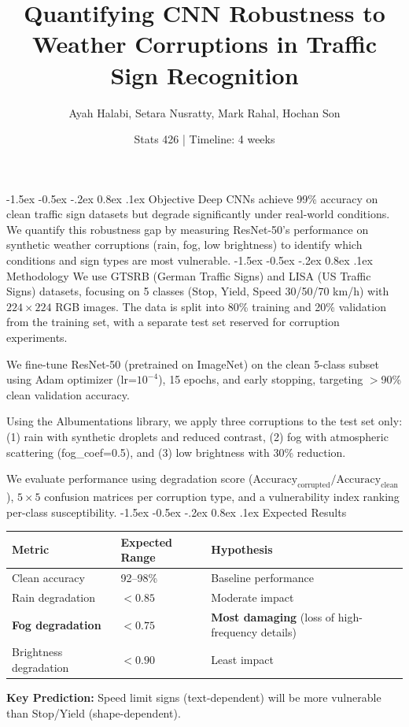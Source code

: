 \documentclass[10pt]{article}
\title{Quantifying CNN Robustness to Weather Corruptions in Traffic Sign Recognition}
\author{Ayah Halabi, Setara Nusratty, Mark Rahal, Hochan Son}
\date{Stats 426 | Timeline: 4 weeks}
\makeatletter
\renewcommand\section{\@startsection{section}{1}{\z@}%
  {-1.5ex \@plus -0.5ex \@minus -.2ex}%
  {0.8ex \@plus.1ex}%
  {\normalfont\Large\bfseries}}
\makeatother
\begin{document}
\maketitle
\section{Objective}
Deep CNNs achieve 99\% accuracy on clean traffic sign datasets but degrade significantly under real-world conditions. We quantify this robustness gap by measuring ResNet-50's performance on synthetic weather corruptions (rain, fog, low brightness) to identify which conditions and sign types are most vulnerable.
\section{Methodology}
We use GTSRB (German Traffic Signs) and LISA (US Traffic Signs) datasets, focusing on 5 classes (Stop, Yield, Speed 30/50/70 km/h) with $224 \times 224$ RGB images. The data is split into 80\% training and 20\% validation from the training set, with a separate test set reserved for corruption experiments.

We fine-tune ResNet-50 (pretrained on ImageNet) on the clean 5-class subset using Adam optimizer (lr=$10^{-4}$), 15 epochs, and early stopping, targeting $>$90\% clean validation accuracy.

Using the Albumentations library, we apply three corruptions to the test set only: (1) rain with synthetic droplets and reduced contrast, (2) fog with atmospheric scattering (fog\_coef=0.5), and (3) low brightness with 30\% reduction.

We evaluate performance using degradation score ($\text{Accuracy}_{\text{corrupted}} / \text{Accuracy}_{\text{clean}}$), $5 \times 5$ confusion matrices per corruption type, and a vulnerability index ranking per-class susceptibility.
\section{Expected Results}
\begin{table}[h]
\centering
\begin{tabular}{lll}
\toprule
\textbf{Metric} & \textbf{Expected Range} & \textbf{Hypothesis} \\
\midrule
Clean accuracy & 92--98\% & Baseline performance \\
Rain degradation & $<0.85$ & Moderate impact \\
\textbf{Fog degradation} & $\mathbf{<0.75}$ & \textbf{Most damaging} (loss of high-frequency details) \\
Brightness degradation & $<0.90$ & Least impact \\
\bottomrule
\end{tabular}
\end{table}
\textbf{Key Prediction:} Speed limit signs (text-dependent) will be more vulnerable than Stop/Yield (shape-dependent).
\end{document}
